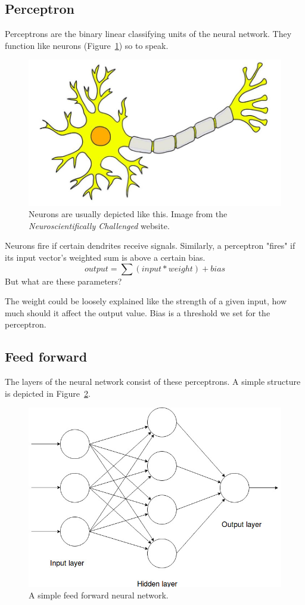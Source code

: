 \subsection{Perceptron}
Perceptrons are the binary linear classifying units of the neural network. They function like neurons (Figure~\ref{fig:neuron}) so to speak.
\begin{figure}[!htb]
	\centering
	\includegraphics[scale=0.1]{neuron.jpg}
	\caption{Neurons are usually depicted like this. Image from the \textit{Neuroscientifically Challenged} website.}
	\label{fig:neuron}
\end{figure}
Neurons fire if certain dendrites receive signals. Similarly, a perceptron "fires" if its input vector's weighted sum is above a certain bias.
\[output = \sum (input * weight) + bias\]
But what are these parameters?

The weight could be loosely explained like the strength of a given input, how much should it affect the output value. Bias is a threshold we set for the perceptron.
\subsection{Feed forward}
The layers of the neural network consist of these perceptrons. A simple structure is depicted in Figure~\ref{fig:neural_net}.
\begin{figure}[!htb]
	\centering
	\includegraphics[scale=0.5]{simple_neural_network.jpg}
	\caption{A simple feed forward neural network.}
	\label{fig:neural_net}
\end{figure}

